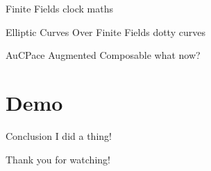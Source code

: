 \documentclass[hyperref={pdfpagemode=FullScreen}, aspectratio=169, 10pt]{beamer}
\begin{document}
\begin{frame}{Finite Fields}
  clock maths
\end{frame}

\begin{frame}{Elliptic Curves Over Finite Fields}
  dotty curves
\end{frame}

\begin{frame}{AuCPace}
  Augmented Composable what now?
\end{frame}

\section{Demo}

\begin{frame}{Conclusion}
  I did a thing!
\end{frame}

\begin{frame}[standout]
  Thank you for watching!
\end{frame}
\end{document}
